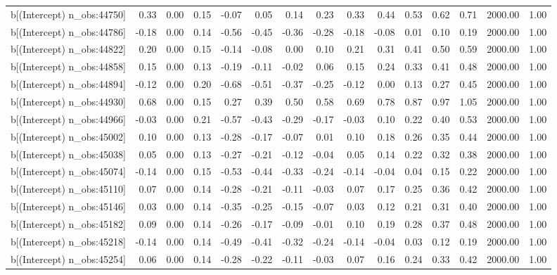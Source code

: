 \begin{table}[ht]
\begin{tabular}{rrrrrrrrrrrrrrr}
  b[(Intercept) n\_obs:44750] & 0.33 & 0.00 & 0.15 & -0.07 & 0.05 & 0.14 & 0.23 & 0.33 & 0.44 & 0.53 & 0.62 & 0.71 & 2000.00 & 1.00 \\ 
  b[(Intercept) n\_obs:44786] & -0.18 & 0.00 & 0.14 & -0.56 & -0.45 & -0.36 & -0.28 & -0.18 & -0.08 & 0.01 & 0.10 & 0.19 & 2000.00 & 1.00 \\ 
  b[(Intercept) n\_obs:44822] & 0.20 & 0.00 & 0.15 & -0.14 & -0.08 & 0.00 & 0.10 & 0.21 & 0.31 & 0.41 & 0.50 & 0.59 & 2000.00 & 1.00 \\ 
  b[(Intercept) n\_obs:44858] & 0.15 & 0.00 & 0.13 & -0.19 & -0.11 & -0.02 & 0.06 & 0.15 & 0.24 & 0.33 & 0.41 & 0.48 & 2000.00 & 1.00 \\ 
  b[(Intercept) n\_obs:44894] & -0.12 & 0.00 & 0.20 & -0.68 & -0.51 & -0.37 & -0.25 & -0.12 & 0.00 & 0.13 & 0.27 & 0.45 & 2000.00 & 1.00 \\ 
  b[(Intercept) n\_obs:44930] & 0.68 & 0.00 & 0.15 & 0.27 & 0.39 & 0.50 & 0.58 & 0.69 & 0.78 & 0.87 & 0.97 & 1.05 & 2000.00 & 1.00 \\ 
  b[(Intercept) n\_obs:44966] & -0.03 & 0.00 & 0.21 & -0.57 & -0.43 & -0.29 & -0.17 & -0.03 & 0.10 & 0.22 & 0.40 & 0.53 & 2000.00 & 1.00 \\ 
  b[(Intercept) n\_obs:45002] & 0.10 & 0.00 & 0.13 & -0.28 & -0.17 & -0.07 & 0.01 & 0.10 & 0.18 & 0.26 & 0.35 & 0.44 & 2000.00 & 1.00 \\ 
  b[(Intercept) n\_obs:45038] & 0.05 & 0.00 & 0.13 & -0.27 & -0.21 & -0.12 & -0.04 & 0.05 & 0.14 & 0.22 & 0.32 & 0.38 & 2000.00 & 1.00 \\ 
  b[(Intercept) n\_obs:45074] & -0.14 & 0.00 & 0.15 & -0.53 & -0.44 & -0.33 & -0.24 & -0.14 & -0.04 & 0.04 & 0.15 & 0.22 & 2000.00 & 1.00 \\ 
  b[(Intercept) n\_obs:45110] & 0.07 & 0.00 & 0.14 & -0.28 & -0.21 & -0.11 & -0.03 & 0.07 & 0.17 & 0.25 & 0.36 & 0.42 & 2000.00 & 1.00 \\ 
  b[(Intercept) n\_obs:45146] & 0.03 & 0.00 & 0.14 & -0.35 & -0.25 & -0.15 & -0.07 & 0.03 & 0.12 & 0.21 & 0.31 & 0.40 & 2000.00 & 1.00 \\ 
  b[(Intercept) n\_obs:45182] & 0.09 & 0.00 & 0.14 & -0.26 & -0.17 & -0.09 & -0.01 & 0.10 & 0.19 & 0.28 & 0.37 & 0.48 & 2000.00 & 1.00 \\ 
  b[(Intercept) n\_obs:45218] & -0.14 & 0.00 & 0.14 & -0.49 & -0.41 & -0.32 & -0.24 & -0.14 & -0.04 & 0.03 & 0.12 & 0.19 & 2000.00 & 1.00 \\ 
  b[(Intercept) n\_obs:45254] & 0.06 & 0.00 & 0.14 & -0.28 & -0.22 & -0.11 & -0.03 & 0.07 & 0.16 & 0.24 & 0.33 & 0.42 & 2000.00 & 1.00 \\ 

\end{tabular}
\end{table}
